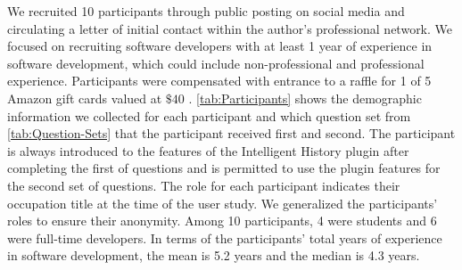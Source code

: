 We recruited 10 participants through public posting on social media and circulating a letter of initial contact within the author's professional network.
We focused on recruiting software developers with at least 1 year of experience in software development, which could include non-professional and professional experience.
Participants were compensated with entrance to a raffle for 1 of 5 Amazon gift cards valued at $\$40$ .
\autoref{tab:Participants} shows the demographic information we collected for each participant and which question set from \autoref{tab:Question-Sets} that the participant received first and second.
The participant is always introduced to the features of the Intelligent History plugin after completing the first of questions and is permitted to use the plugin features for the second set of questions.
The role for each participant indicates their occupation title at the time of the user study.
We generalized the participants' roles to ensure their anonymity.
Among 10 participants, 4 were students and 6 were full-time developers.
In terms of the participants' total years of experience in software development, the mean is 5.2 years and the median is 4.3 years.

